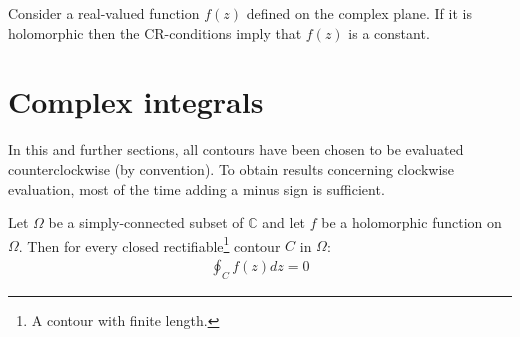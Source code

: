 	\begin{property}
		Consider a real-valued function $f(z)$ defined on the complex plane. If it is holomorphic then the CR-conditions imply that $f(z)$ is a constant.
	\end{property}

\section{Complex integrals}
		
	In this and further sections, all contours have been chosen to be evaluated counterclockwise (by convention). To obtain results concerning clockwise evaluation, most of the time adding a minus sign is sufficient.
        
        
        \begin{theorem}
        	Let $\Omega$ be a simply-connected subset of $\mathbb{C}$ and let $f$ be a holomorphic function on $\Omega$. Then for every closed rectifiable\footnote{A contour with finite length.} contour $C$  in $\Omega$:
        	\begin{gather}
			\label{complexcalculus:cauchy_integral_theorem}
        	        \boxed{\oint_C f(z) dz = 0}
		\end{gather}
        \end{theorem}
        
